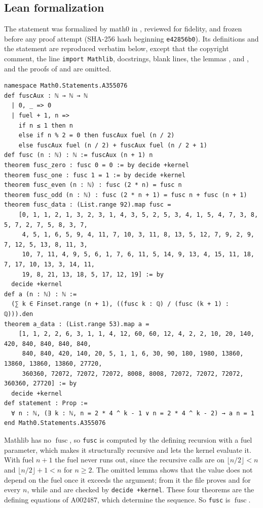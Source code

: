 \documentclass[11pt]{amsart}
\theoremstyle{plain}
\theoremstyle{definition}
\DeclareMathOperator{\fusc}{fusc}
\begin{document}
\subsection*{Lean formalization}
The statement was formalized by math0 in , reviewed for fidelity, and frozen before any proof attempt (SHA-256 hash beginning \texttt{e42856b0}). Its definitions and the statement are reproduced verbatim below, except that the copyright comment, the line \texttt{import Mathlib}, docstrings, blank lines, the lemmas ,  and , and the proofs of  and  are omitted.
\begin{lstlisting}
namespace Math0.Statements.A355076
def fuscAux : ℕ → ℕ → ℕ
  | 0, _ => 0
  | fuel + 1, n =>
    if n ≤ 1 then n
    else if n % 2 = 0 then fuscAux fuel (n / 2)
    else fuscAux fuel (n / 2) + fuscAux fuel (n / 2 + 1)
def fusc (n : ℕ) : ℕ := fuscAux (n + 1) n
theorem fusc_zero : fusc 0 = 0 := by decide +kernel
theorem fusc_one : fusc 1 = 1 := by decide +kernel
theorem fusc_even (n : ℕ) : fusc (2 * n) = fusc n
theorem fusc_odd (n : ℕ) : fusc (2 * n + 1) = fusc n + fusc (n + 1)
theorem fusc_data : (List.range 92).map fusc =
    [0, 1, 1, 2, 1, 3, 2, 3, 1, 4, 3, 5, 2, 5, 3, 4, 1, 5, 4, 7, 3, 8, 5, 7, 2, 7, 5, 8, 3, 7,
     4, 5, 1, 6, 5, 9, 4, 11, 7, 10, 3, 11, 8, 13, 5, 12, 7, 9, 2, 9, 7, 12, 5, 13, 8, 11, 3,
     10, 7, 11, 4, 9, 5, 6, 1, 7, 6, 11, 5, 14, 9, 13, 4, 15, 11, 18, 7, 17, 10, 13, 3, 14, 11,
     19, 8, 21, 13, 18, 5, 17, 12, 19] := by
  decide +kernel
def a (n : ℕ) : ℕ :=
  (∑ k ∈ Finset.range (n + 1), ((fusc k : ℚ) / (fusc (k + 1) : ℚ))).den
theorem a_data : (List.range 53).map a =
    [1, 1, 2, 2, 6, 3, 1, 1, 4, 12, 60, 60, 12, 4, 2, 2, 10, 20, 140, 420, 840, 840, 840, 840,
     840, 840, 420, 140, 20, 5, 1, 1, 6, 30, 90, 180, 1980, 13860, 13860, 13860, 13860, 27720,
     360360, 72072, 72072, 72072, 8008, 8008, 72072, 72072, 72072, 360360, 27720] := by
  decide +kernel
def statement : Prop :=
  ∀ n : ℕ, (∃ k : ℕ, n = 2 * 4 ^ k - 1 ∨ n = 2 * 4 ^ k - 2) → a n = 1
end Math0.Statements.A355076
\end{lstlisting}

Mathlib has no $\fusc$, so \texttt{fusc} is computed by the defining recursion with a fuel parameter, which makes it structurally recursive and lets the kernel evaluate it. With fuel $n+1$ the fuel never runs out, since the recursive calls are on $\lfloor n/2\rfloor<n$ and $\lfloor n/2\rfloor+1<n$ for $n\ge2$. The omitted lemma  shows that the value does not depend on the fuel once it exceeds the argument; from it the file proves  and  for every $n$, while  and  are checked by \texttt{decide +kernel}. These four theorems are the defining equations of A002487, which determine the sequence. So \texttt{fusc} is $\fusc$.
\end{document}
